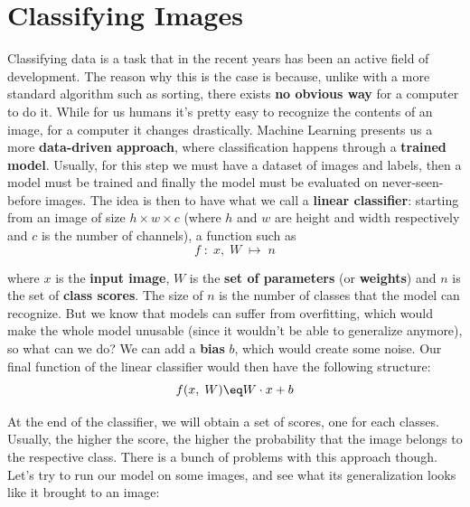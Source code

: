 \section{Classifying Images}

Classifying data is a task that in the recent years has been an active field of development. The reason why this is the case is because, unlike with a more standard algorithm such as sorting, there exists \textbf{no obvious way} for a computer to do it. While for us humans it's pretty easy to recognize the contents of an image, for a computer it changes drastically.
\nwl
Machine Learning presents us a more \textbf{data-driven approach}, where classification happens through a \textbf{trained model}. Usually, for this step we must have a dataset of images and labels, then a model must be trained and finally the model must be evaluated on never-seen-before images.
\nwl
The idea is then to have what we call a \textbf{linear classifier}: starting from an image of size $h \times w \times c$ (where $h$ and $w$ are height and width respectively and $c$ is the number of channels), a function such as
\[ f \; : \; x, \; W \; \longmapsto \; n \]

where $x$ is the \textbf{input image}, $W$ is the \textbf{set of parameters} (or \textbf{weights}) and $n$ is the set of \textbf{class scores}. The size of $n$ is the number of classes that the model can recognize.
\nwl
But we know that models can suffer from overfitting, which would make the whole model unusable (since it wouldn't be able to generalize anymore), so what can we do? We can add a \textbf{bias} $b$, which would create some noise. Our final function of the linear classifier would then have the following structure:
\[ f(x, \; W) \eq W \cdot x + b \]

At the end of the classifier, we will obtain a set of scores, one for each classes. Usually, the higher the score, the higher the probability that the image belongs to the respective class.
\nwl
There is a bunch of problems with this approach though. Let's try to run our model on some images, and see what its generalization looks like it brought to an image:


